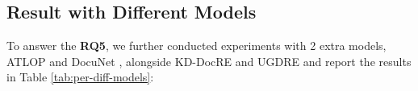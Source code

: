 \subsection{Result with Different Models}
\label{subsec:result-diff-models}
To answer the \textbf{RQ5}, we further conducted experiments with 2 extra models, ATLOP \cite{zhou2021document} and DocuNet \cite{zhang2021document}, alongside KD-DocRE and UGDRE and report the results in Table \ref{tab:per-diff-models}:
\begin{table}[!h]
\caption{Performance with different models. Results of ATLOP and DocuNet are reported from \citet{sun2023uncertainty}.}
\label{tab:per-diff-models}
\vspace{-5mm}
\end{table}

